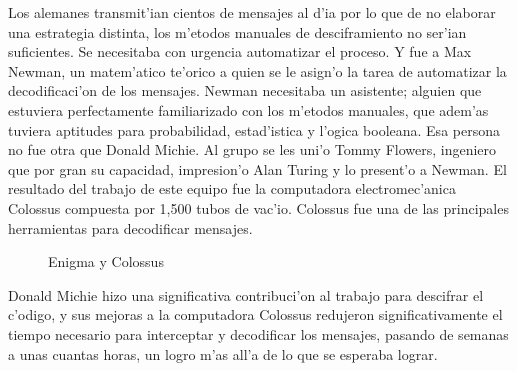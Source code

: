 \documentclass[11pt]{article}
\begin{document}
Los alemanes transmit'ian cientos de mensajes al d'ia por lo que de no elaborar una estrategia distinta, los m'etodos manuales de desciframiento no ser'ian suficientes. Se necesitaba con urgencia automatizar el proceso. Y fue a Max Newman, un matem'atico te'orico a quien se le asign'o la tarea de automatizar la decodificaci'on de los mensajes. Newman necesitaba un asistente; alguien que estuviera perfectamente familiarizado con los m'etodos manuales, que adem'as tuviera aptitudes para probabilidad, estad'istica y l'ogica booleana. Esa persona no fue otra que Donald Michie. Al grupo se les uni'o Tommy Flowers, ingeniero que por gran su capacidad, impresion'o Alan Turing y lo present'o a Newman. El resultado del trabajo de este equipo fue la computadora electromec'anica Colossus compuesta por 1,500 tubos de vac'io. Colossus fue una de las principales herramientas para decodificar mensajes.



\begin{figure}[h]
\begin{center}

\caption{Enigma y Colossus}
  \label{fig:enigmacolossus}
\end{center}
\end{figure} 

Donald Michie hizo una significativa contribuci'on al trabajo para descifrar el c'odigo, y sus mejoras a la computadora Colossus redujeron significativamente el tiempo necesario para interceptar y decodificar los mensajes, pasando de semanas a unas cuantas horas, un logro m'as all'a de lo que se esperaba lograr.
\end{document}
